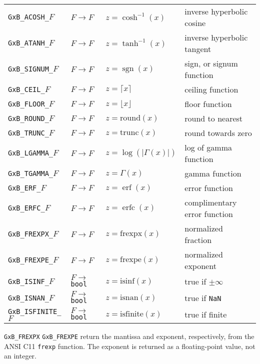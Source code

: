 \documentclass[12pt]{article}
\DeclareMathOperator{\sgn}{sgn}
\DeclareMathOperator{\erf}{erf}
\DeclareMathOperator{\erfc}{erfc}
\begin{document}
{\begin{tabular}{|llll|}
\verb'GxB_ACOSH_'$F$    & $F \rightarrow F$ & $z = \cosh^{-1}(x)$        & inverse hyperbolic cosine \\
\verb'GxB_ATANH_'$F$    & $F \rightarrow F$ & $z = \tanh^{-1}(x)$        & inverse hyperbolic tangent \\
\hline
\verb'GxB_SIGNUM_'$F$   & $F \rightarrow F$ & $z = \sgn(x)$                 & sign, or signum function \\
\verb'GxB_CEIL_'$F$     & $F \rightarrow F$ & $z = \lceil x \rceil $       & ceiling function \\
\verb'GxB_FLOOR_'$F$    & $F \rightarrow F$ & $z = \lfloor x \rfloor $     & floor function \\
\verb'GxB_ROUND_'$F$    & $F \rightarrow F$ & $z = \mbox{round}(x)$        & round to nearest \\
\verb'GxB_TRUNC_'$F$    & $F \rightarrow F$ & $z = \mbox{trunc}(x)$        & round towards zero \\
\hline
\verb'GxB_LGAMMA_'$F$   & $F \rightarrow F$ & $z = \log(|\Gamma (x)|)$  & log of gamma function \\
\verb'GxB_TGAMMA_'$F$   & $F \rightarrow F$ & $z = \Gamma(x)$        & gamma function \\
\verb'GxB_ERF_'$F$      & $F \rightarrow F$ & $z = \erf(x)$          & error function \\
\verb'GxB_ERFC_'$F$     & $F \rightarrow F$ & $z = \erfc(x)$         & complimentary error function \\
\hline
\verb'GxB_FREXPX_'$F$   & $F \rightarrow F$ & $z = \mbox{frexpx}(x)$  & normalized fraction \\
\verb'GxB_FREXPE_'$F$   & $F \rightarrow F$ & $z = \mbox{frexpe}(x)$  & normalized exponent \\
\hline
\verb'GxB_ISINF_'$F$    & $F \rightarrow $ \verb'bool' & $z = \mbox{isinf}(x)$ & true if $\pm \infty$ \\
\verb'GxB_ISNAN_'$F$    & $F \rightarrow $ \verb'bool' & $z = \mbox{isnan}(x)$ & true if \verb'NaN' \\
\verb'GxB_ISFINITE_'$F$ & $F \rightarrow $ \verb'bool' & $z = \mbox{isfinite}(x)$ & true if finite \\
\hline
\end{tabular}
\vspace{0.2in}

\verb'GxB_FREXPX' \verb'GxB_FREXPE' return the mantissa and exponent, respectively,
from the ANSI C11 \verb'frexp' function.  The exponent is returned as a
floating-point value, not an integer.

}
\end{document}
